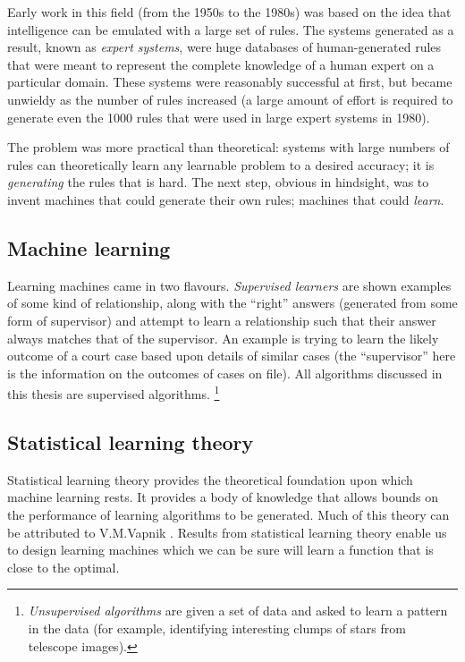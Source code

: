 Early work in this field (from the 1950s to the 1980s) was based on
the idea that intelligence can be emulated with a large set of rules.
The systems generated as a result, known as \emph{expert systems},
were huge databases of human-generated rules that were meant to
represent the complete knowledge of a human expert on a particular
domain.  These systems were reasonably successful at first, but became
unwieldy as the number of rules increased (a large amount of effort is
required to generate even the 1000 rules that were used in large
expert systems in 1980). 

The problem was more practical than theoretical: systems with large
numbers of rules can theoretically learn any learnable problem to a
desired accuracy; it is \emph{generating} the rules that is hard.  The
next step, obvious in hindsight, was to invent machines that could
generate their own rules; machines that could \emph{learn}.


\subsection{Machine learning}

Learning machines came in two flavours.  \emph{Supervised learners} are
shown examples of some kind of relationship, along with the ``right''
answers (generated from some form of supervisor) and attempt to learn a
relationship such that their answer always matches that of the
supervisor.  An example is trying to learn the likely outcome of a
court case based upon details of similar cases (the ``supervisor''
here is the information on the outcomes of cases on file).  All
algorithms discussed in this thesis are supervised algorithms.
\footnote{\emph{Unsupervised algorithms} are given a set of data and
asked to learn a pattern in the data (for example, identifying
interesting clumps of stars from telescope images).}


\subsection{Statistical learning theory}

Statistical learning theory provides the theoretical foundation upon
which machine learning rests.  It provides a body of knowledge that
allows bounds on the performance of learning algorithms to be
generated.  Much of this theory can be attributed to V.M.Vapnik
\cite{Vapnik98}.  Results from statistical learning theory enable us
to design learning machines which we can be sure will learn a function
that is close to the optimal.

